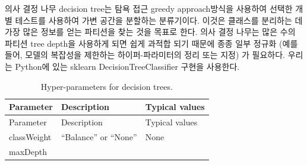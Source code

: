 \documentclass[10.5pt]{book}
\theoremstyle{definition}
\theoremstyle{definition}
\theoremstyle{definition}
\theoremstyle{remark}
\begin{document}
의사 결정 나무 decision tree는 탐욕 접근 greedy approach방식을 사용하여
선택한 개별 테스트를 사용하여 가변 공간을 분할하는 분류기이다. 이것은
클래스를 분리하는 데 가장 많은 정보를 얻는 파티션을 찾는 것을 목표로
한다. 의사 결정 나무는 많은 수의 파티션 tree depth을 사용하게 되면 쉽게
과적합 되기 때문에 종종 일부 정규화 (예를 들어, 모델의 복잡성을 제한하는
하이퍼-파라미터의 정리 또는 지정) 가 필요하다. 우리는 Python에 있는
sklearn DecisionTreeClassifier 구현을 사용한다. 

\begin{longtable}[]{@{}lll@{}}
\caption{\label{tab:decisionTreeParameters} Hyper-parameters for decision
trees.}\tabularnewline
\toprule
\begin{minipage}[b]{0.13\columnwidth}\raggedright\strut
Parameter\strut
\end{minipage} & \begin{minipage}[b]{0.16\columnwidth}\raggedright\strut
Description\strut
\end{minipage} & \begin{minipage}[b]{0.20\columnwidth}\raggedright\strut
Typical values\strut
\end{minipage}\tabularnewline
\midrule
\endfirsthead
\toprule
\begin{minipage}[b]{0.13\columnwidth}\raggedright\strut
Parameter\strut
\end{minipage} & \begin{minipage}[b]{0.16\columnwidth}\raggedright\strut
Description\strut
\end{minipage} & \begin{minipage}[b]{0.20\columnwidth}\raggedright\strut
Typical values\strut
\end{minipage}\tabularnewline
\midrule
\endhead
\begin{minipage}[t]{0.13\columnwidth}\raggedright\strut
classWeight\strut
\end{minipage} & \begin{minipage}[t]{0.16\columnwidth}\raggedright\strut
``Balance'' or ``None''\strut
\end{minipage} & \begin{minipage}[t]{0.20\columnwidth}\raggedright\strut
None\strut
\end{minipage}\tabularnewline
\begin{minipage}[t]{0.13\columnwidth}\raggedright\strut
maxDepth\strut
\end{minipage} & \begin{minipage}[t]{0.16\columnwidth}\raggedright\strut

\end{minipage}
\end{longtable}
\end{document}
